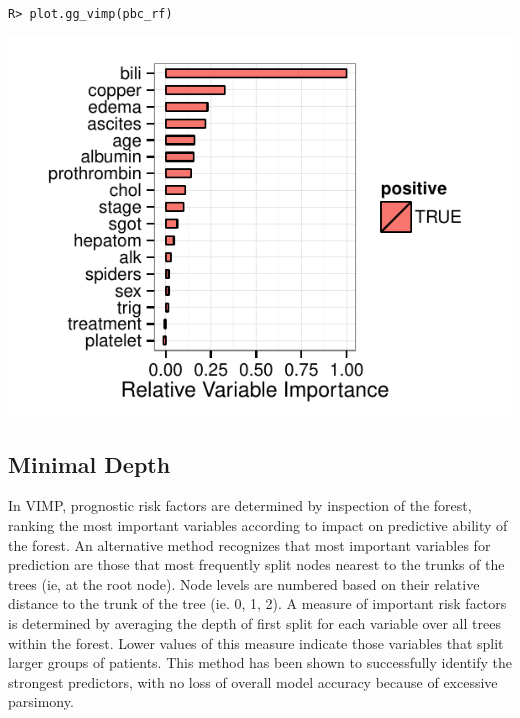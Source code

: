 \documentclass[nojss]{jss}\usepackage[]{graphicx}\usepackage[]{color}
\makeatletter
\def\maxwidth{ %
  \ifdim\Gin@nat@width>\linewidth
    \linewidth
  \else
    \Gin@nat@width
  \fi
}
\newenvironment{kframe}{%
 \def\at@end@of@kframe{}%
 \ifinner\ifhmode%
  \def\at@end@of@kframe{\end{minipage}}%
  \begin{minipage}{\columnwidth}%
 \fi\fi%
 \def\FrameCommand##1{\hskip\@totalleftmargin \hskip-\fboxsep
 \colorbox{shadecolor}{##1}\hskip-\fboxsep
     \hskip-\linewidth \hskip-\@totalleftmargin \hskip\columnwidth}%
 \MakeFramed {\advance\hsize-\width
   \@totalleftmargin\z@ \linewidth\hsize
   \@setminipage}}%
 {\par\unskip\endMakeFramed%
 \at@end@of@kframe}
\newenvironment{knitrout}{}{} %
\makeatother
\begin{document}
\begin{knitrout}\footnotesize
{}\color{fgcolor}\begin{kframe}
\begin{verbatim}
R> plot.gg_vimp(pbc_rf)
\end{verbatim}


{\ttfamily\noindent\color{warningcolor}{Warning: Stacking not well defined when ymin != 0}}\end{kframe}

{\centering \includegraphics[width=\maxwidth]{figure/beamer-pbc-vimp-1} 

}



\end{knitrout}

\subsection{Minimal Depth}\label{S:minimalDepth}
In VIMP, prognostic risk factors are determined by inspection of the forest, ranking the most important variables according to impact on predictive ability of the forest. An alternative method recognizes that most important variables for prediction are those that most frequently split nodes nearest to the trunks of the trees (ie, at the root node). Node levels are numbered based on their relative distance to the trunk of the tree (ie. 0, 1, 2).  A measure of important risk factors is determined by averaging the depth of first split for each variable over all trees within the forest. Lower values of this measure indicate those variables that split larger groups of patients. This method has been shown to successfully identify the strongest predictors, with no loss of overall model accuracy because of excessive parsimony.
\end{document}
